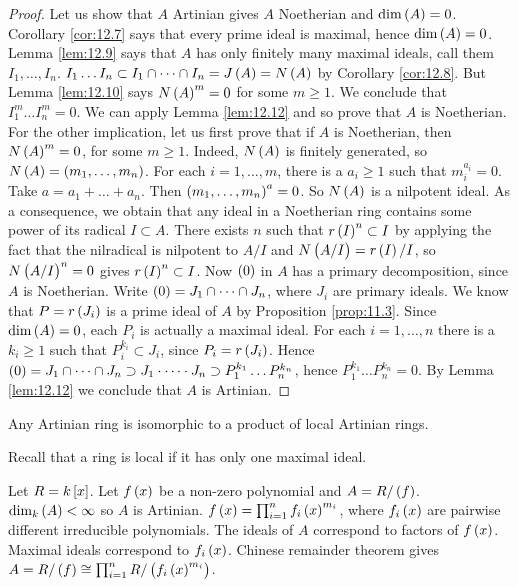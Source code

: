 \begin{proof}
Let us show that $ A $ Artinian gives $ A $ Noetherian and $ \dim\br{A} = 0 $. Corollary \ref{cor:12.7} says that every prime ideal is maximal, hence $ \dim\br{A} = 0 $. Lemma \ref{lem:12.9} says that $ A $ has only finitely many maximal ideals, call them $ I_1, \dots, I_n $. $ I_1 \dots I_n \subset I_1 \cap \dots \cap I_n = J\br{A} = N\br{A} $ by Corollary \ref{cor:12.8}. But Lemma \ref{lem:12.10} says $ N\br{A}^m = 0 $ for some $ m \ge 1 $. We conclude that $ I_1^m \dots I_n^m = 0 $. We can apply Lemma \ref{lem:12.12} and so prove that $ A $ is Noetherian. For the other implication, let us first prove that if $ A $ is Noetherian, then $ N\br{A}^m = 0 $, for some $ m \ge 1 $. Indeed, $ N\br{A} $ is finitely generated, so $ N\br{A} = \br{m_1, \dots, m_n} $. For each $ i = 1, \dots, m $, there is a $ a_i \ge 1 $ such that $ m_i^{a_i} = 0 $. Take $ a = a_1 + \dots + a_n $. Then $ \br{m_1, \dots, m_n}^a = 0 $. So $ N\br{A} $ is a nilpotent ideal. As a consequence, we obtain that any ideal in a Noetherian ring contains some power of its radical $ I \subset A $. There exists $ n $ such that $ r\br{I}^n \subset I $ by applying the fact that the nilradical is nilpotent to $ A / I $ and $ N\br{A / I} = r\br{I} / I $, so $ N\br{A / I}^n = 0 $ gives $ r\br{I}^n \subset I $. Now $ \br{0} $ in $ A $ has a primary decomposition, since $ A $ is Noetherian. Write $ \br{0} = J_1 \cap \dots \cap J_n $, where $ J_i $ are primary ideals. We know that $ P = r\br{J_i} $ is a prime ideal of $ A $ by Proposition \ref{prop:11.3}. Since $ \dim\br{A} = 0 $, each $ P_i $ is actually a maximal ideal. For each $ i = 1, \dots, n $ there is a $ k_i \ge 1 $ such that $ P_i^{k_i} \subset J_i $, since $ P_i = r\br{J_i} $. Hence $ \br{0} = J_1 \cap \dots \cap J_n \supset J_1 \cdot \dots \cdot J_n \supset P_1^{k_1} \dots P_n^{k_n} $, hence $ P_1^{k_1} \dots P_n^{k_n} = 0 $. By Lemma \ref{lem:12.12} we conclude that $ A $ is Artinian.
\end{proof}

\pagebreak


\begin{theorem}
\label{thm:12.15}
Any Artinian ring is isomorphic to a product of local Artinian rings.
\end{theorem}

Recall that a ring is local if it has only one maximal ideal.

\begin{example*}
Let $ R = k\sbr{x} $. Let $ f\br{x} $ be a non-zero polynomial and $ A = R / \br{f} $. $ \dim_k\br{A} < \infty $ so $ A $ is Artinian. $ f\br{x} = \prod_{i = 1}^n f_i\br{x}^{m_i} $, where $ f_i\br{x} $ are pairwise different irreducible polynomials. The ideals of $ A $ correspond to factors of $ f\br{x} $. Maximal ideals correspond to $ f_i\br{x} $. Chinese remainder theorem gives $ A = R / \br{f} \cong \prod_{i = 1}^n R / \br{f_i\br{x}^{m_i}} $.
\end{example*}

